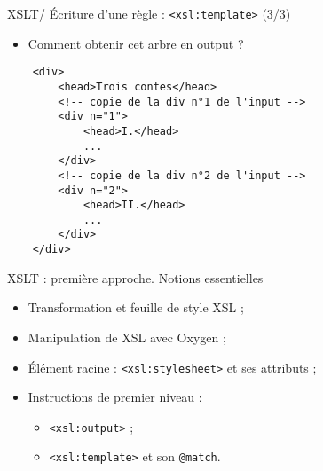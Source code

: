 \documentclass{beamer}
\begin{document}
    \begin{frame}[fragile]{XSLT/ Écriture d'une règle : \texttt{<xsl:template>} (3/3)}
    \Large
        \begin{itemize}
            \item Comment obtenir cet arbre en output ?
        \end{itemize}
        \normalsize
        \begin{verbatim}
    <div>
        <head>Trois contes</head>
        <!-- copie de la div n°1 de l'input -->
        <div n="1">
            <head>I.</head>
            ...
        </div>
        <!-- copie de la div n°2 de l'input -->
        <div n="2">
            <head>II.</head>
            ...
        </div>
    </div>
        \end{verbatim}
        
    \end{frame}

    \begin{frame}{XSLT : première approche. Notions essentielles}
        \Large
        \begin{itemize}
            \item Transformation et feuille de style XSL ;
            \bigskip
            \item Manipulation de XSL avec Oxygen ;
            \bigskip
            \item Élément racine : \texttt{<xsl:stylesheet>} et ses attributs ;
            \bigskip
            \item Instructions de premier niveau :
            \begin{itemize}
            \Large
                \item \texttt{<xsl:output>} ;
                \item \texttt{<xsl:template>} et son \texttt{@match}.
            \end{itemize}
        \end{itemize}
    \end{frame}
\end{document}
